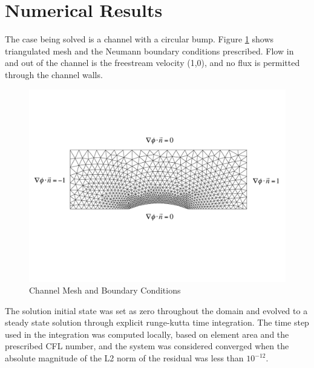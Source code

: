 \documentclass[a4paper]{article}
\begin{document}
\section{Numerical Results}
The case being solved is a channel with a circular bump.  Figure
\ref{fig:boundary-conditions} shows triangulated mesh and the Neumann boundary conditions
prescribed.  Flow in and out of the channel is the freestream velocity (1,0),
and no flux is permitted through the channel walls.
\begin{figure}[h]
  \centering
  \includegraphics[width=\textwidth,trim={0 4cm 0 4cm},clip]{figures/boundary_conditions}
  \caption{Channel Mesh and Boundary Conditions}
  \label{fig:boundary-conditions}
\end{figure}
The solution initial state was set as zero throughout the domain and evolved to
a steady state solution through explicit runge-kutta time integration.  The
time step used in the integration was computed locally, based on element area
and the prescribed CFL number, and the system was considered converged when the
absolute magnitude of the L2 norm of the residual was less than $10^{-12}$.
\end{document}
